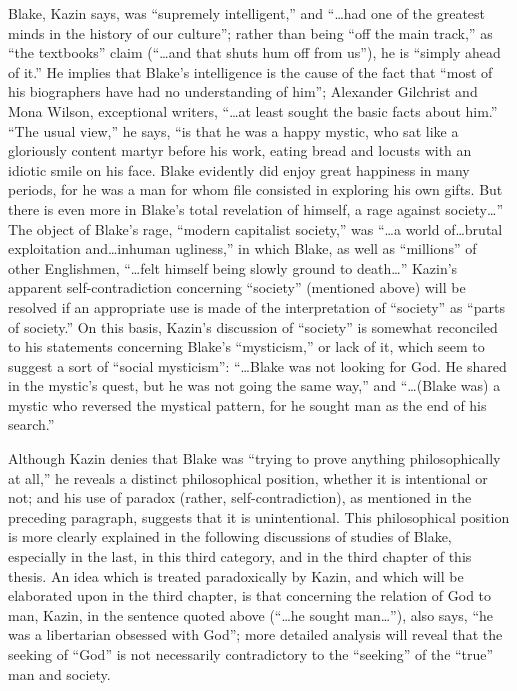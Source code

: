 \label{self:13}

Blake, Kazin says, was \enquote{supremely intelligent,} and \enquote{\dots had one of the greatest minds in the history of our culture};\supercite{kazin:portable-blake}
rather than being \enquote{off the main track,} as \enquote{the textbooks} claim (\enquote{\dots and that shuts hum off from us}), he is \enquote{simply
ahead of it.}\supercite{kazin:portable-blake}
He implies that Blake's intelligence is the cause of the fact that \enquote{most of his biographers have had no
understanding of him}; Alexander Gilchrist and Mona Wilson, exceptional writers, \enquote{\dots at least sought the basic facts about him.}\supercite{kazin:portable-blake}
\enquote{The usual view,} he says, \enquote{is that he was a happy mystic, who sat like a gloriously content martyr before his work, eating bread and locusts with an idiotic smile
on his face. Blake evidently did enjoy great happiness in many periods, for he was a man for whom file consisted in exploring his own
gifts. But there is even more in Blake's total revelation of himself, a rage against society\dots}\supercite{kazin:portable-blake}
The object of Blake's rage, \enquote{modern capitalist
society,} was \enquote{\dots a world of\dots brutal exploitation and\dots inhuman ugliness,} in which Blake, as well
as \enquote{millions} of other Englishmen, \enquote{\dots felt himself being slowly ground to death\dots}\supercite{kazin:portable-blake}
Kazin's apparent self-contradiction concerning
\enquote{society} (mentioned above) will be resolved if an appropriate use is made of the interpretation
of \enquote{society} as \enquote{parts of society.} On this basis, Kazin's discussion of \enquote{society} is somewhat reconciled
to his statements concerning Blake's \enquote{mysticism,} or lack of it, which seem to suggest a sort of \enquote{social
mysticism}: \enquote{\dots Blake was not looking for God. He shared in the mystic's quest, but he was not going the same way,}\supercite{kazin:portable-blake}
and \enquote{\dots(Blake was) a mystic who reversed the mystical pattern, for he sought man as the end of his search.}\supercite{kazin:portable-blake}

Although Kazin denies that Blake was \enquote{trying to prove
anything philosophically at all,} he reveals a distinct
philosophical position, whether it is intentional or not;
and his use of paradox (rather, self-contradiction), as mentioned
in the preceding paragraph, suggests that it is unintentional. This
philosophical position is more clearly explained in the following discussions
of studies of Blake, especially in the last, in this third category, and in the
third chapter of this thesis. An idea which is treated paradoxically by Kazin, and which
will be elaborated upon in the third chapter, is that concerning the relation of
God to man, Kazin, in the sentence quoted above (\enquote{\dots he
sought man\dots}), also says, \enquote{he was a libertarian obsessed with God};
more detailed analysis will reveal that the seeking of \enquote{God} is not necessarily contradictory
to the \enquote{seeking} of the \enquote{true} man and society.

